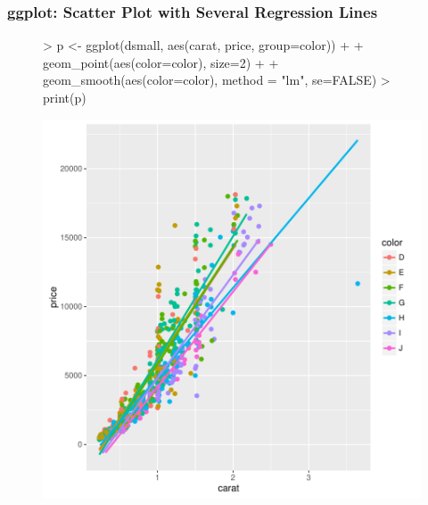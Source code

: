\documentclass{beamer}
\begin{document}
\begin{frame}[containsverbatim]  
	\frametitle{ggplot: Scatter Plot with Several Regression Lines}
\scriptsize 
\begin{figure}
  \centering
\begin{Schunk}
\begin{Sinput}
> p <- ggplot(dsmall, aes(carat, price, group=color)) + 
+             geom_point(aes(color=color), size=2) + 
+             geom_smooth(aes(color=color), method = "lm", se=FALSE) 
> print(p) 
\end{Sinput}
\end{Schunk}
\includegraphics{fig--046}
\label{fig:qplotscatter}
\end{figure}
\end{frame}
\end{document}
